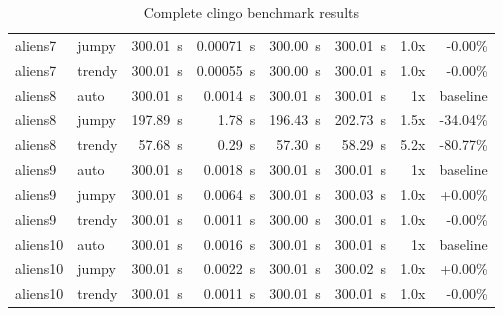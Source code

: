 \documentclass[11pt]{article}
\begin{document}
\begin{table}[h]
\begin{tabular}{|llrrrrrr|}
    aliens7 & jumpy & 300.01~s & 0.00071~s & 300.00~s & 300.01~s & 1.0x & -0.00\% \\
    aliens7 & trendy & 300.01~s & 0.00055~s & 300.00~s & 300.01~s & 1.0x & -0.00\% \\
    \hline
    aliens8 & auto & 300.01~s & 0.0014~s & 300.01~s & 300.01~s & 1x & baseline \\
    aliens8 & jumpy & 197.89~s & 1.78~s & 196.43~s & 202.73~s & 1.5x & -34.04\% \\
    aliens8 & trendy & 57.68~s & 0.29~s & 57.30~s & 58.29~s & 5.2x & -80.77\% \\
    \hline
    aliens9 & auto & 300.01~s & 0.0018~s & 300.01~s & 300.01~s & 1x & baseline \\
    aliens9 & jumpy & 300.01~s & 0.0064~s & 300.01~s & 300.03~s & 1.0x & +0.00\% \\
    aliens9 & trendy & 300.01~s & 0.0011~s & 300.00~s & 300.01~s & 1.0x & -0.00\% \\
    \hline
    aliens10 & auto & 300.01~s & 0.0016~s & 300.01~s & 300.01~s & 1x & baseline \\
    aliens10 & jumpy & 300.01~s & 0.0022~s & 300.01~s & 300.02~s & 1.0x & +0.00\% \\
    aliens10 & trendy & 300.01~s & 0.0011~s & 300.01~s & 300.01~s & 1.0x & -0.00\% \\
    \hline
  \end{tabular}
  \caption{Complete clingo benchmark results}
  \label{table:clingo-bench-comparative}
\end{table}
\end{document}
